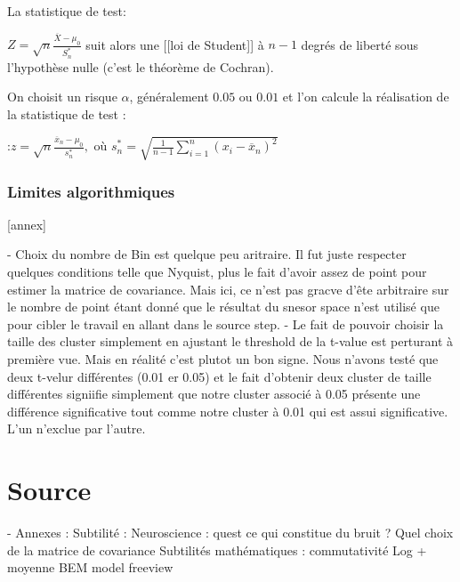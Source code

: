 La statistique de test:

$ Z = \sqrt{n}\frac{\overline{X} - \mu_0}{S^{\ast}_n}$
suit alors une [[loi de Student]] à $n-1$ degrés de liberté sous l'hypothèse nulle (c'est le théorème de Cochran).

On choisit un risque $\alpha$, généralement $0.05$ ou $0.01$ et l'on calcule la réalisation de la statistique de test :

:$z = \sqrt{n}\frac{\overline{x}_n - \mu_0}{s^{\ast}_n},$ où $s^{\ast}_n =\sqrt{\frac{1}{n-1}\sum\limits_{i=1}^n (x_i - \overline x_n )^2} $




\subsection{Limites algorithmiques}
[annex]

- Choix du nombre de Bin est quelque peu aritraire. Il fut juste respecter quelques conditions telle que Nyquist, plus le fait d'avoir assez de point pour estimer la matrice de covariance. Mais ici, ce n'est pas gracve d'ête arbitraire sur le nombre de point étant donné que le résultat du snesor space n'est utilisé que pour cibler le travail en allant dans le source step.
- Le fait de pouvoir choisir la taille des cluster simplement en ajustant le threshold de la t-value est perturant à première vue. Mais en réalité c'est plutot un bon signe. Nous n'avons testé que deux t-velur différentes (0.01 er 0.05) et le fait d'obtenir deux cluster de taille différentes signiifie simplement que notre cluster associé à 0.05 présente une différence significative tout comme notre cluster à 0.01 qui est assui significative. L'un n'exclue par l'autre.


\chapter{Source}

- Annexes : Subtilité :
Neuroscience : quest ce qui constitue du bruit ? Quel choix de la matrice de covariance
Subtilités mathématiques :  commutativité Log + moyenne
BEM model freeview



